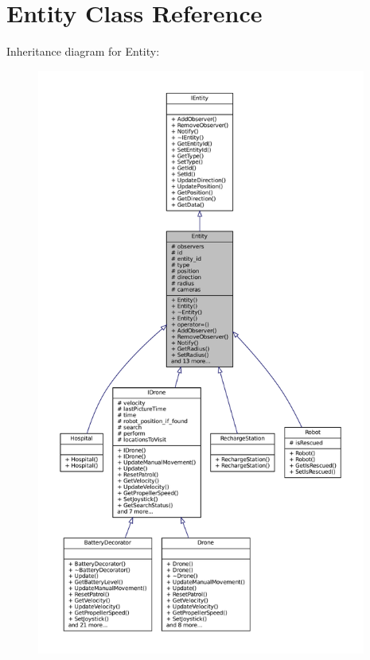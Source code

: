 \hypertarget{classEntity}{}\section{Entity Class Reference}
\label{classEntity}


Inheritance diagram for Entity\+:\nopagebreak
\begin{figure}[H]
\begin{center}
\leavevmode
\includegraphics[height=550pt]{classEntity__inherit__graph}
\end{center}
\end{figure}


